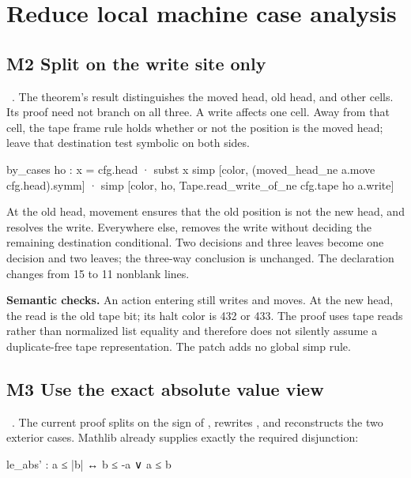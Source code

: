 \section{Reduce local machine case analysis}

\subsection{M2 Split on the write site only}

\ . The theorem's result distinguishes the moved head, old head, and other cells. Its proof need not branch on all three. A write affects one cell. Away from that cell, the tape frame rule holds whether or not the position is the moved head; leave that destination test symbolic on both sides.

\begin{Lean}
  by_cases ho : x = cfg.head
  · subst x
    simp [color, (moved_head_ne a.move cfg.head).symm]
  · simp [color, ho, Tape.read_write_of_ne cfg.tape ho a.write]
\end{Lean}

At the old head, movement ensures that the old position is not the new head, and  resolves the write. Everywhere else,  removes the write without deciding the remaining destination conditional. Two decisions and three leaves become one decision and two leaves; the three-way conclusion is unchanged. The declaration changes from 15 to 11 nonblank lines.

\textbf{Semantic checks.} An action entering  still writes and moves. At the new head, the read is the old tape bit; its halt color is 432 or 433. The proof uses tape reads rather than normalized list equality and therefore does not silently assume a duplicate-free tape representation. The patch adds no global simp rule.

\subsection{M3 Use the exact absolute value view}

\ . The current proof splits on the sign of , rewrites , and reconstructs the two exterior cases. Mathlib already supplies exactly the required disjunction:

\begin{Lean}
le_abs' : a ≤ |b| ↔ b ≤ -a ∨ a ≤ b
\end{Lean}

